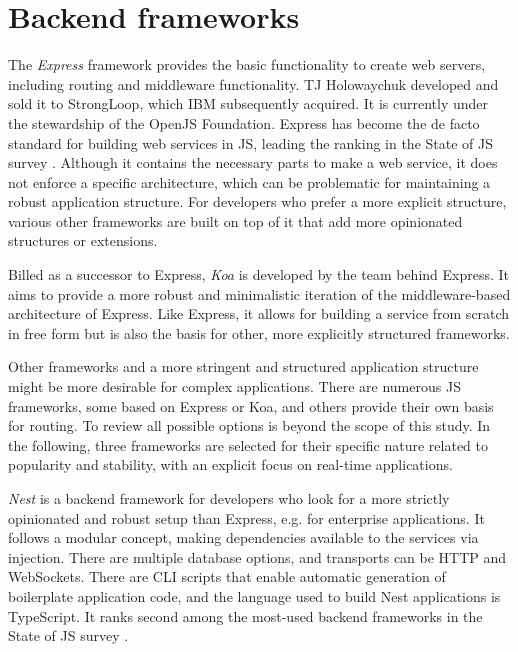 \section{Backend frameworks}

The \emph{Express} framework provides the basic functionality to create web servers, including routing and middleware functionality. TJ Holowaychuk developed and sold it to StrongLoop, which IBM subsequently acquired. It is currently under the stewardship of the OpenJS Foundation. Express has become the de facto standard for building web services in JS, leading the ranking in the State of JS survey \parencite{mostUsedBackendFrameworks22}. Although it contains the necessary parts to make a web service, it does not enforce a specific architecture, which can be problematic for maintaining a robust application structure. For developers who prefer a more explicit structure, various other frameworks are built on top of it that add more opinionated structures or extensions.

Billed as a successor to Express, \emph{Koa} is developed by the team behind Express. It aims to provide a more robust and minimalistic iteration of the middleware-based architecture of Express. Like Express, it allows for building a service from scratch in free form but is also the basis for other, more explicitly structured frameworks.

Other frameworks and a more stringent and structured application structure might be more desirable for complex applications. There are numerous \ac{JS} frameworks, some based on Express or Koa, and others provide their own basis for routing. To review all possible options is beyond the scope of this study. In the following, three frameworks are selected for their specific nature related to popularity and stability, with an explicit focus on real-time applications.



\emph{Nest} is a backend framework for developers who look for a more strictly opinionated and robust setup than Express, e.g. for enterprise applications. It follows a modular concept, making dependencies available to the services via injection. There are multiple database options, and transports can be HTTP and WebSockets. There are \ac{CLI} scripts that enable automatic generation of boilerplate application code, and the language used to build Nest applications is TypeScript. It ranks second among the most-used backend frameworks in the State of JS survey \parencite{mostUsedBackendFrameworks22}.

